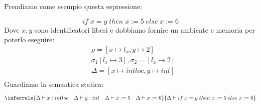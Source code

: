 \documentclass[a4paper]{article}
\begin{document}
\begin{Example}{}
Prendiamo come esempio questa espressione:

\[
  if \; x = y \; then \; x := 5 \; else \; x:= 6
\]
Dove $x, y$ sono identificatori liberi e dobbiamo fornire un ambiente e memoria per poterlo eseguire:
\[
\begin{aligned}
  &\rho = [x \mapsto l_x, y \mapsto 2 ] \\
  &\sigma_1 [l_x \mapsto 3], \sigma_2 = [l_x \mapsto 2]\\
  &\Delta = [x \mapsto intloc, y \mapsto int]\\
\end{aligned}
\]
Guardiamo la semantica statica:
\[
  \inferrule
  {\Delta \vdash x : intloc \quad \Delta \vdash y : int \quad \Delta \vdash x := 5 \quad \Delta \vdash x := 6}
  {\Delta \vdash if \; x = y \; then \; x := 5 \; else \; x := 6}
\]


\end{Example}
\end{document}
